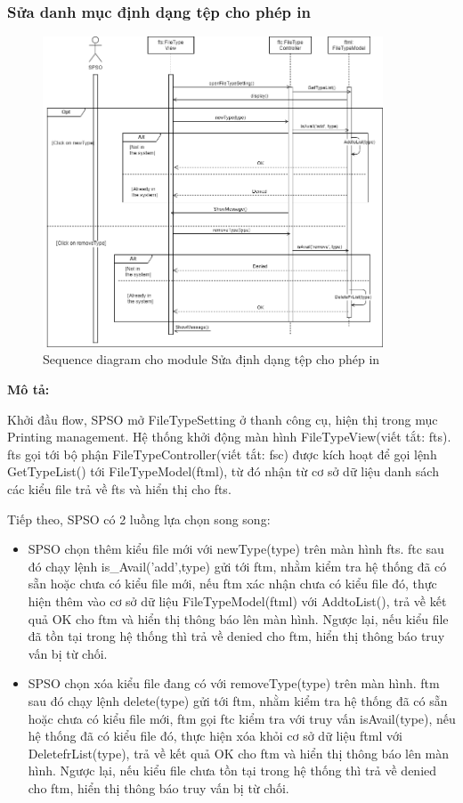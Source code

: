 \subsubsection{Sửa danh mục định dạng tệp cho phép in}

\begin{figure}[H]
    \begin{center}
        \includegraphics[width=0.9\textwidth]{Images/System Modelling/FileTypeSetting_Sequence.png}
        \caption{Sequence diagram cho module Sửa định dạng tệp cho phép in}
        \label{fig:arch}
    \end{center}
\end{figure}
\textbf{Mô tả:}\par
Khởi đầu flow, SPSO mở FileTypeSetting ở thanh công cụ, hiện thị trong mục Printing management. Hệ thống khởi động màn hình FileTypeView(viết tắt: fts). fts gọi tới bộ phận FileTypeController(viết tắt: fsc) được kích hoạt để gọi lệnh GetTypeList() tới FileTypeModel(ftml), từ đó nhận từ cơ sở dữ liệu danh sách các kiểu file trả về fts và hiển thị cho fts.\par
Tiếp theo, SPSO có 2 luồng lựa chọn song song:
\begin{itemize}
    \item SPSO chọn thêm kiểu file mới với newType(type) trên màn hình fts. ftc sau đó chạy lệnh is\_Avail('add',type) gửi tới ftm, nhằm kiểm tra hệ thống đã có sẵn hoặc chưa có kiểu file mới, nếu ftm xác nhận chưa có kiểu file đó, thực hiện thêm vào cơ sở dữ liệu FileTypeModel(ftml) với AddtoList(), trả về kết quả OK cho ftm và hiển thị thông báo lên màn hình. Ngược lại, nếu kiểu file đã tồn tại trong hệ thống thì trả về denied cho ftm, hiển thị thông báo truy vấn bị từ chối.
    \item SPSO chọn xóa kiểu file đang có với removeType(type) trên màn hình. ftm sau đó chạy lệnh delete(type) gửi tới ftm, nhằm kiểm tra hệ thống đã có sẵn hoặc chưa có kiểu file mới, ftm gọi ftc kiểm tra với truy vấn isAvail(type), nếu hệ thống đã có kiểu file đó, thực hiện xóa khỏi cơ sở dữ liệu ftml với DeletefrList(type), trả về kết quả OK cho ftm và hiển thị thông báo lên màn hình. Ngược lại, nếu kiểu file chưa tồn tại trong hệ thống thì trả về denied cho ftm, hiển thị thông báo truy vấn bị từ chối.
\end{itemize}
